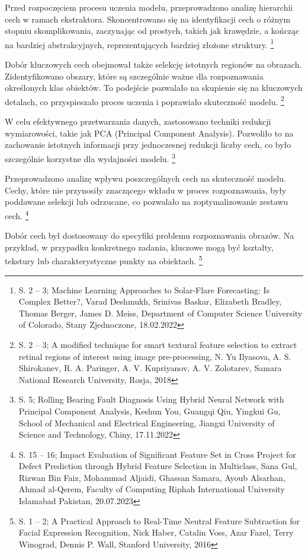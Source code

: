 \documentclass[12pt, a4paper, twoside, openany]{book}
\begin{document}
{%
Przed rozpoczęciem procesu uczenia modelu, przeprowadzono analizę hierarchii cech w ramach ekstraktora.
Skoncentrowano się na identyfikacji cech o różnym stopniu skomplikowania, zaczynając od prostych, takich jak krawędzie, a kończąc na bardziej abstrakcyjnych, reprezentujących bardziej złożone struktury. \footnote{ S. 2 -- 3; Machine Learning Approaches to Solar-Flare Forecasting: Is Complex Better?, Varad Deshmukh, Srinivas Baskar, Elizabeth Bradley, Thomas Berger, James D. Meiss, Department of Computer Science University of Colorado, Stany Zjednoczone, 18.02.2022}

Dobór kluczowych cech obejmował także selekcję istotnych regionów na obrazach.
Zidentyfikowano obszary, które są szczególnie ważne dla rozpoznawania określonych klas obiektów.
To podejście pozwalało na skupienie się na kluczowych detalach, co przyspieszało proces uczenia i poprawiało skuteczność modelu. \footnote{ S. 2 -- 3; A modified technique for smart textural feature selection to extract retinal regions of interest using image pre-processing, N. Yu Ilyasova, A. S. Shirokanev, R. A. Paringer, A. V. Kupriyanov, A. V. Zolotarev, Samara National Research University, Rosja, 2018}

W celu efektywnego przetwarzania danych, zastosowano techniki redukcji wymiarowości, takie jak PCA (Principal Component Analysis).
Pozwoliło to na zachowanie istotnych informacji przy jednoczesnej redukcji liczby cech, co było szczególnie korzystne dla wydajności modelu. \footnote{ S. 5; Rolling Bearing Fault Diagnosis Using Hybrid Neural Network with Principal Component Analysis, Keshun You, Guangqi Qiu, Yingkui Gu, School of Mechanical and Electrical Engineering, Jiangxi University of Science and Technology, Chiny, 17.11.2022}

Przeprowadzono analizę wpływu poszczególnych cech na skuteczność modelu.
Cechy, które nie przynosiły znaczącego wkładu w proces rozpoznawania, były poddawane selekcji lub odrzucane, co pozwalało na zoptymalizowanie zestawu cech. \footnote{ S. 15 -- 16; Impact Evaluation of Significant Feature Set in Cross Project for Defect Prediction through Hybrid Feature Selection in Multiclass, Sana Gul, Rizwan Bin Faiz, Mohammad Aljaidi, Ghassan Samara, Ayoub Alsarhan, Ahmad al-Qerem, Faculty of Computing Riphah International University Islamabad Pakistan, 20.07.2023}

Dobór cech był dostosowany do specyfiki problemu rozpoznawania obrazów.
Na przykład, w przypadku konkretnego zadania, kluczowe mogą być kształty, tekstury lub charakterystyczne punkty na obiektach. \footnote{ S. 1 -- 2; A Practical Approach to Real-Time Neutral Feature Subtraction for Facial Expression Recognition, Nick Haber, Catalin Voss, Azar Fazel, Terry Winograd, Dennis P. Wall, Stanford University, 2016}

}
\end{document}
